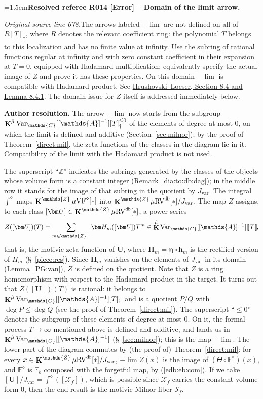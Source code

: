 \documentclass[12pt]{amsart}
\newcommand{\ResolvedRefereeRemark}[5]{%
  \par\medskip\begingroup\normalfont\small\color{gray}%
  \emergencystretch=1.5em\noindent\textbf{Resolved referee R#1 [#2] -- #3.}\par\nobreak\noindent #4\par
  \medskip\color{ResolutionGreen}\noindent\textbf{Author resolution.} #5\par
  \endgroup\medskip
}
\theoremstyle{plain}
\theoremstyle{definition}
\theoremstyle{remark}
\numberwithin{equation}{section}
\theoremstyle{plain}
\newcommand{\VF}{\textup{VF}}
\newcommand{\RV}{\textup{RV}}
\newcommand{\Z}{\mathds{Z}}
\newcommand{\A}{\mathds{A}}
\newcommand{\C}{\mathds{C}}
\newcommand{\0}{\emptyset}
\newcommand{\dbra}[1]{%
  \,[\mkern-6.8mu[\, #1 \,]\mkern-6.8mu]}
\newcommand{\mdl}[1]{\mathcal{#1}}  %
\newcommand{\bb}[1]{\mathbb{#1}}
\newcommand{\limplies}{\rightarrow}
\newcommand{\mgVF}{{\mu} {\VF}}
\newcommand{\mgRV}{{\mu}{\RV}}
\DeclareMathOperator{\ggk}{\mathbf{K}}
\DeclareMathOperator{\db}{d \! b}
\newcommand{\var}{\textup{Var}}
\newcommand{\gmv}{\ggk^{\hat \mu}\var_{\C}}
\begin{document}
\ResolvedRefereeRemark{014}{Error}{Domain of the limit arrow}{%
\textit{Original source line 678.}\quad The arrows labeled $-\lim$ are not defined on all of $R[T]_{\dag}$, where $R$ denotes the relevant coefficient ring: the polynomial $T$ belongs to this localization and has no finite value at infinity. Use the subring of rational functions regular at infinity and with zero constant coefficient in their expansion at $T=0$, equipped with Hadamard multiplication; equivalently specify the actual image of $Z$ and prove it has these properties. On this domain $-\lim$ is compatible with Hadamard product. See \href{https://arxiv.org/pdf/1111.1954}{Hrushovski--Loeser, Section 8.4 and Lemma 8.4.1}. The domain issue for $Z$ itself is addressed immediately below.
}{The arrow $-\lim$ now starts from the subgroup $\gmv[[\A]^{-1}][T]_{\dag}^{\leq 0}$ of the elements of degree at most $0$, on which the limit is defined and additive (Section~\ref{sec:milnor}); by the proof of Theorem~\ref{direct:mil}, the zeta functions of the classes in the diagram lie in it. Compatibility of the limit with the Hadamard product is not used.}
The superscript ``$\Z$'' indicates the subrings generated by the classes of the objects whose volume form is a constant integer (Remark~\ref{dia:to:db:dag}); in the middle row it stands for the image of that subring in the quotient by $J_{\mathrm{var}}$. The integral $\int^\diamond$ maps $\ggk^{\Z} \mgVF^\diamond[*]$ into $\ggk^{\Z} \mgRV^{\db}[*] / J_{\mathrm{var}}$. The map $Z$ assigns, to each class $[\bm U] \in \ggk^{\Z} \mgRV^{\db}[*]$, a power series
\[
Z([\bm U])(T) = \sum_{m \in \Z^+} \bm H_m([\bm U]) T^m \in \ggk^{\hat \mu} \var_{\C}[[\A]^{-1}] \dbra T,
\]
that is, the motivic zeta function of $\bm U$, where $\bm H_m = \bm \eta \circ \bm h_m$ is the rectified version of $H_m$ (\S~\ref{piece:res}). Since $\bm H_m$ vanishes on the elements of $J_{\mathrm{var}}$ in its domain (Lemma~\ref{PG:van}), $Z$ is defined on the quotient. Note that $Z$ is a ring homomorphism with respect to the Hadamard product in the target. It turns out that $Z([\bm U])(T)$ is rational: it belongs to $\gmv[[\A]^{-1}][T]_{\dag}$ and is a quotient $P/Q$ with $\deg P \leq \deg Q$ (see the proof of Theorem~\ref{direct:mil}). The superscript ``$\leq 0$'' denotes the subgroup of these elements of degree at most $0$. On it, the formal process $T \limplies \infty$ mentioned above is defined and additive, and lands us in $\gmv[[\A]^{-1}]$ (\S~\ref{sec:milnor}); this is the map $-\lim$. The lower part of the diagram commutes by (the proof of) Theorem~\ref{direct:mil}: for every $x \in \ggk^{\Z} \mgRV^{\db}[*]/J_{\mathrm{var}}$, $-\lim Z(x)$ is the image of $(\Theta \circ \bb E^\diamond)(x)$, and $\bb E^{\diamond}$ is $\bb E_b$ composed with the forgetful map, by (\ref{edb:eb:com}). If we take $[\bm U] / J_{\mathrm{var}} = \int^{\diamond}([\mdl X_f])$, which is possible since $\mdl X_f$ carries the constant volume form $0$, then the end result is the motivic Milnor fiber $\mathscr S_{f}$.
\end{document}
